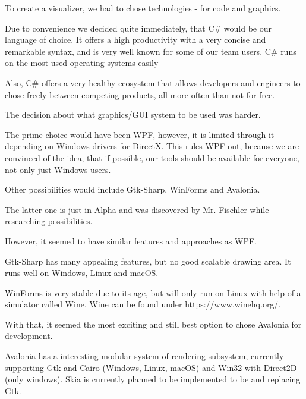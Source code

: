 To create a visualizer, we had to chose technologies - for code and graphics.

Due to convenience we decided quite immediately, that C\# would be our language of choice.
It offers a high productivity with a very concise and remarkable syntax, and is very well known for some of our team users. C\# runs on the most used operating systems easily

Also, C\# offers a very healthy ecosystem that allows developers and engineers to chose freely between competing products, all more often than not for free.

The decision about what graphics/GUI system to be used was harder.

The prime choice would have been WPF, however, it is limited through it depending on Windows drivers for DirectX.
This rules WPF out, because we are convinced of the idea, that if possible, our tools should be available for everyone, not only just Windows users.

Other possibilities would include Gtk-Sharp, WinForms and Avalonia.

The latter one is just in Alpha and was discovered by Mr. Fischler while researching possibilities.

However, it seemed to have similar features and approaches as WPF.

Gtk-Sharp has many appealing features, but no good scalable drawing area. It runs well on Windows, Linux and macOS.

WinForms is very stable due to its age, but will only run on Linux with help of a simulator called Wine. Wine can be found under https://www.winehq.org/.

With that, it seemed the most exciting and still best option to chose Avalonia for development.

Avalonia has a interesting modular system of rendering subsystem, currently supporting Gtk and Cairo (Windows, Linux, macOS) and Win32 with Direct2D (only windows). Skia is currently planned to be implemented to be and replacing Gtk.